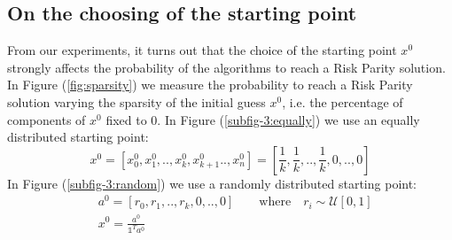 \subsection{On the choosing of the starting point}
From our experiments, it turns out that the choice of the starting point $x^0$ strongly affects the probability of the algorithms to reach a Risk Parity solution.  In Figure (\ref{fig:sparsity}) we measure the probability to reach a Risk Parity solution varying the sparsity of the initial guess $x^0$, i.e. the percentage of components of $x^0$ fixed to 0. In Figure (\ref{subfig-3:equally}) we use an equally distributed starting point:
\begin{equation}
x^{0} = \left[x^{0}_0, x^{0}_1, .. ,  x^{0}_k, x^{0}_{k+1} .., x^{0}_n \right] = \left[\frac{1}{k}, \frac{1}{k}, .., \frac{1}{k}, 0, .., 0 \right]
\end{equation}
In Figure (\ref{subfig-3:random}) we use a randomly distributed starting point:
\begin{equation}
\begin{aligned}
&a^{0} = \left[r_0, r_1, ..,r_k, 0, .., 0 \right] \qquad \text{where} \quad r_i \sim \mathcal{U}[0,1]\\
&x^0 = \frac{a^{0}}{\mathds{1}^T a^0}
\end{aligned}
\end{equation}


